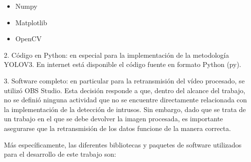 \begin{itemize}
	\item Numpy
	\item Matplotlib
	\item OpenCV
\end{itemize}
 
2. Código en Python: en especial para la implementación de la metodología YOLOV3. En internet está disponible el código fuente en formato Python (py).

3. Software completo: en particular para la retransmisión del vídeo procesado, se utilizó OBS Studio. Esta decisión responde a que, dentro del alcance del trabajo, no se definió ninguna actividad que no se encuentre directamente relacionada con la implementación de la detección de intrusos. Sin embargo, dado que se trata de un trabajo en el que se debe devolver la imagen procesada, es importante asegurarse que la retransmisión de los datos funcione de la manera correcta.

Más específicamente, las diferentes bibliotecas y paquetes de software utilizados para el desarrollo de este trabajo son:

\begin{table}[h]
\centering
\caption{Software requerido para el desarrollo y la ejecución del módulo.}
\label{software-requerido-mini}
\end{table}

